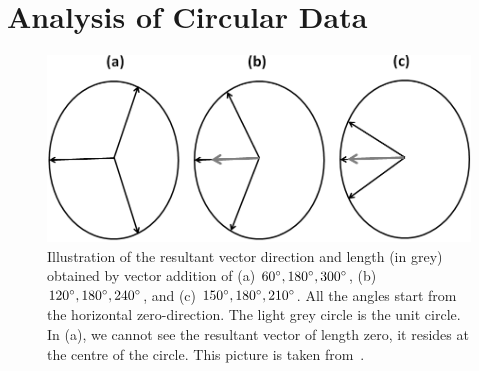 \documentclass[10pt,journal,cspaper,compsoc]{IEEEtran}
\begin{document}
%
%
%
\section{Analysis of Circular Data}
\label{sec_analysis}

\begin{figure}[tp!]
      \centering
      \includegraphics[scale=0.5]{figures/Ch6/vector_addition.png}
      \caption{Illustration of the resultant vector direction and length (in grey) obtained by vector addition of (a) $60\degree, 180\degree, 300\degree$, (b) $120\degree, 180\degree, 240\degree$, and (c) $150\degree, 180\degree, 210\degree$. All the angles start from the horizontal zero-direction. The light grey circle is the unit circle. In (a), we cannot see the resultant vector of length zero, it resides at the centre of the circle. This picture is taken from~\cite{berens2009circstat}.}
      \label{fig_vector_addition}
\end{figure}
\end{document}
